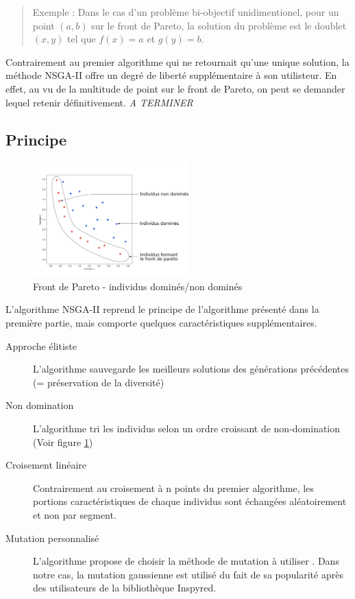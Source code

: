\documentclass[12pt]{report}
\begin{document}
    \begin{quotation}
      Exemple : Dans le cas d'un problème bi-objectif unidimentionel, pour un point $(a,b)$ sur le front de Pareto, la solution du problème est le doublet $(x,y)$ tel que $f(x)=a$ et $g(y)=b$.
    \end{quotation}

    Contrairement au premier algorithme qui ne retournait qu'une unique solution, la méthode NSGA-II offre un degré de liberté supplémentaire à son utilisteur. En effet, au vu de la multitude de point sur le front de Pareto, on peut se demander lequel retenir définitivement.
    \emph{A TERMINER}

      \subsection{Principe}
      \begin{figure}
        \centering
        \includegraphics[width=6cm]{img/Pareto_domine.png}
        \caption{Front de Pareto - individus dominés/non dominés}
        \label{non_domine}
      \end{figure}
      L'algorithme NSGA-II reprend le principe de l'algorithme présenté dans la première partie, mais comporte quelques caractéristiques supplémentaires.


      \begin{description}
        \item [Approche élitiste] L'algorithme sauvegarde les meilleurs solutions des générations précédentes (= préservation de la diversité)
        \item [Non domination] L'algorithme tri les individus selon un ordre croissant de non-domination (Voir figure \ref{non_domine})
        \item [Croisement linéaire] Contrairement au croisement à n points du premier algorithme, les portions caractéristiques de chaque individus sont échangées aléatoirement et non par segment.
        \item [Mutation personnalisé] L'algorithme propose de choisir la méthode de mutation à utiliser \cite{wiki6}. Dans notre cas, la mutation gaussienne est utilisé du fait de sa popularité après des utilisateurs de la bibliothèque Inspyred.
      \end{description}
\end{document}
